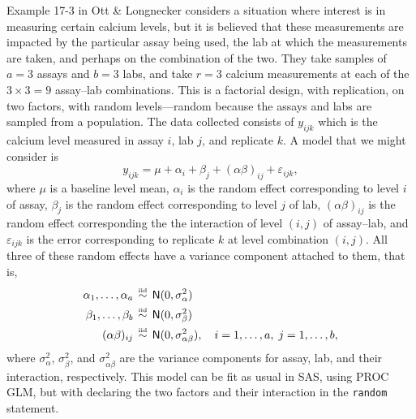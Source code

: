 \documentclass[a4paper, 12pt]{article}
\theoremstyle{plain}
\theoremstyle{definition}
\theoremstyle{remark}
\newcommand{\eps}{\varepsilon}
\newcommand{\nm}{\mathsf{N}}
\newcommand{\iid}{\overset{\text{\tiny iid}}{\,\sim\,}}
\begin{document}
Example 17-3 in Ott \& Longnecker considers a situation where interest is in measuring certain calcium levels, but it is believed that these measurements are impacted by the particular assay being used, the lab at which the measurements are taken, and perhaps on the combination of the two.  They take samples of $a=3$ assays and $b=3$ labs, and take $r=3$ calcium measurements at each of the $3 \times 3 = 9$ assay--lab combinations.  This is a factorial design, with replication, on two factors, with random levels---random because the assays and labs are sampled from a population.  The data collected consists of $y_{ijk}$ which is the calcium level measured in assay $i$, lab $j$, and replicate $k$.  A model that we might consider is 
\[ y_{ijk} = \mu + \alpha_i + \beta_j + (\alpha\beta)_{ij} + \eps_{ijk}, \]
where $\mu$ is a baseline level mean, $\alpha_i$ is the random effect corresponding to level $i$ of assay, $\beta_j$ is the random effect corresponding to level $j$ of lab, $(\alpha\beta)_{ij}$ is the random effect corresponding the the interaction of level $(i,j)$ of assay--lab, and $\eps_{ijk}$ is the error corresponding to replicate $k$ at level combination $(i,j)$.  All three of these random effects have a variance component attached to them, that is, 
\begin{align*}
\alpha_1,\ldots,\alpha_a & \iid \nm(0, \sigma_\alpha^2) \\
\beta_1, \ldots,\beta_b & \iid \nm(0, \sigma_\beta^2) \\
(\alpha\beta)_{ij} & \iid \nm(0, \sigma_{\alpha\beta}^2), \quad i=1,\ldots,a, \; j=1,\ldots,b, 
\end{align*}
where $\sigma_\alpha^2$, $\sigma_\beta^2$, and $\sigma_{\alpha\beta}^2$ are the variance components for assay, lab, and their interaction, respectively.  This model can be fit as usual in SAS, using PROC GLM, but with declaring the two factors and their interaction in the {\tt random} statement.  
\end{document}
